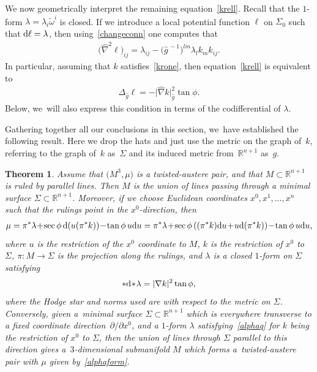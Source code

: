 \documentclass[pdftex]{sigma}
\def\R{\mathbb{R}}
\def\di{\partial}
\def\wt{\tilde\omega}
\def\ghat{\widehat{g}}
\def\hatnabla{\widehat{\nabla}}
\newtheorem{Theorem}{Theorem}[section]
\numberwithin{equation}{section}
\begin{document}
We now geometrically interpret the remaining equation~\eqref{krell}. Recall that the $1$-form $\lambda = \lambda_i \wt^i$ is closed. If we introduce a local potential function $\ell$ on $\Sigma_0$ such that ${\rm d}\ell = \lambda$, then using~\eqref{changeconn} one computes that
\begin{gather*}
\big(\hatnabla^2 \ell\big)_{ij} = \lambda_{ij} -\big(\ghat^{\,-1}\big)^{lm} \lambda_l k_m k_{ij}.
\end{gather*}
In particular, assuming that $k$ satisfies~\eqref{krone}, then equation~\eqref{krell} is equivalent to
\begin{gather*} %
\Delta_{\ghat} \ell = - \big|\hatnabla k\big|^2_{\ghat} \tan \phi.
\end{gather*}
Below, we~will also express this condition in terms of the codifferential of $\lambda$.

Gathering together all our conclusions in this section, we~have established the following result. Here we drop the hats and just use the metric on the graph of~$k$, referring to the graph of~$k$ as~$\Sigma$ and its induced metric from~$\R^{n+1}$ as~$g$.
\begin{Theorem} \label{cylinderthm}
Assume that $\big(M^3,\mu\big)$ is a twisted-austere pair, and that $M \subset \R^{n+1}$ is ruled by parallel lines. Then $M$ is the union of lines passing through a minimal surface $\Sigma \subset \R^{n+1}$. Moreover, if we choose Euclidean coordinates $x^0, x^1, \dots, x^n$ such that the rulings point in the $x^0$-direction, then
\begin{gather}
\mu = \pi^*\lambda \!+\! \sec\phi \, {\rm d} ( u(\pi^* k)) \!-\! \tan\phi \, u {\rm d}u
 = \pi^*\lambda \!+\! \sec\phi \, ( (\pi^* k) {\rm d}u \!+\! u {\rm d} (\pi^* k)) \!-\! \tan\phi \, u {\rm d}u,
\label{alphaform}
\end{gather}
where $u$ is the restriction of the $x^0$ coordinate to $M$, $k$ is the restriction of $x^0$ to $\Sigma$,
$\pi\colon M \to \Sigma$ is the projection along the rulings, and $\lambda$ is a closed $1$-form on $\Sigma$ satisfying
\begin{gather} \label{alphaq}
*{\rm d}\! *\!\lambda = |\nabla k|^2 \tan\phi,
\end{gather}
where the Hodge star and norms used are with respect to the metric on $\Sigma$. Conversely, given a~minimal surface $\Sigma \subset \R^{n+1}$ which is everywhere transverse to a fixed coordinate direc\-tion~$\di/\di x^0$, and a $1$-form $\lambda$ satisfying~\eqref{alphaq} for $k$ being the restriction of $x^0$ to $\Sigma$, then the union of lines through $\Sigma$ parallel to this direction gives a~$3$-dimensional submanifold $M$ which forms a~twisted-austere pair with $\mu$ given by~\eqref{alphaform}.
\end{Theorem}
\end{document}
